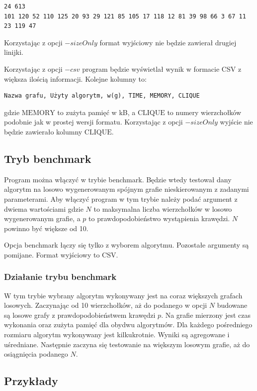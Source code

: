 \documentclass[12pt, a4paper]{article}
\begin{document}
\begin{verbatim}
24 613
101 120 52 110 125 20 93 29 121 85 105 17 118 12 81 39 98 66 3 67 11 23 119 47
\end{verbatim}

Korzystając z opcji $-sizeOnly$ format wyjściowy nie będzie zawierał drugiej linijki. 

Korzystając z opcji $-csv$ program będzie wyświetlał wynik w formacie CSV z większa ilością informacji. Kolejne kolumny to:
\begin{verbatim}
Nazwa grafu, Użyty algorytm, w(g), TIME, MEMORY, CLIQUE
\end{verbatim}

gdzie $\text{MEMORY}$ to zużyta pamięć w kB, a $\text{CLIQUE}$ to numery wierzchołków podobnie jak w prostej wersji formatu. Korzystając z opcji $-sizeOnly$ wyjście nie będzie zawierało kolumny $\text{CLIQUE}$.

\subsection{Tryb benchmark}
Program można włączyć w trybie benchmark. Będzie wtedy testował dany algorytm na losowo wygenerowanym spójnym grafie nieskierowanym z zadanymi parameterami. Aby włączyć program w tym trybie należy podać argument z dwiema wartościami \emph{} gdzie $N$ to maksymalna liczba wierzchołków w losowo wygenerowanym grafie, a $p$ to prawdopodobieństwo wystąpienia krawędzi. $N$ powinno być większe od 10.

Opcja benchmark łączy się tylko z wyborem algorytmu. Pozostałe argumenty są pomijane. Format wyjściowy to CSV.

\subsubsection{Działanie trybu benchmark}
W tym trybie wybrany algorytm wykonywany jest na coraz większych grafach losowych. Zaczynając od 10 wierzchołków, aż do podanego w opcji $N$ budowane są losowe grafy z prawdopodobieństwem krawędzi $p$. Na grafie mierzony jest czas wykonania oraz zużyta pamięć dla obydwu algorytmów. Dla każdego pośredniego rozmiaru algorytm wykonywany jest kilkukrotnie. Wyniki są agregowane i uśredniane. Następnie zaczyna się testowanie na większym losowym grafie, aż do osiągnięcia podanego $N$.

\subsection{Przykłady}
\end{document}
